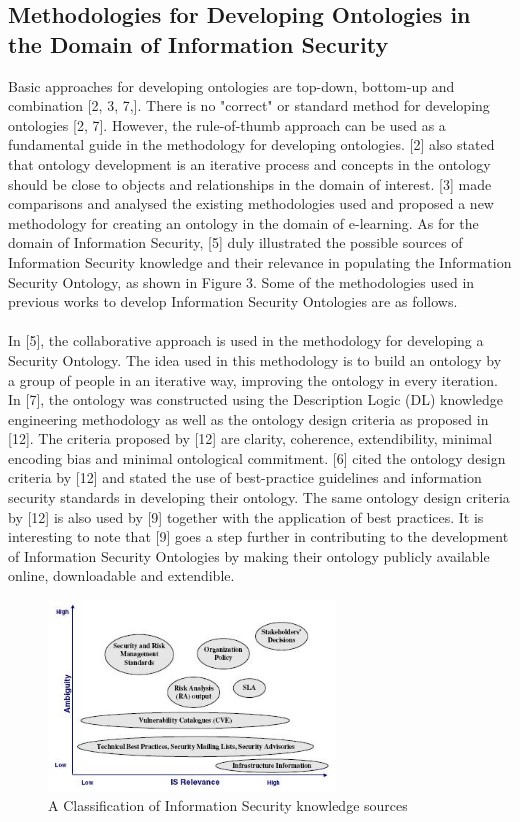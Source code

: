 \documentclass[conference, compsoc]{IEEEtran}
\begin{document}
\subsection{Methodologies for Developing Ontologies in the Domain of Information Security}
Basic approaches for developing ontologies are top-down, bottom-up and combination [2, 3, 7,]. There is no "correct" or standard method for developing ontologies [2, 7]. However, the rule-of-thumb approach can be used as a fundamental guide in the methodology for developing ontologies. [2] also stated that ontology development is an iterative process and concepts in the ontology should be close to objects and relationships in the domain of interest. [3] made comparisons and analysed the existing methodologies used and proposed a new methodology for creating an ontology in the domain of e-learning. As for the domain of Information Security, [5] duly illustrated the possible sources of Information Security knowledge and their relevance in  populating the Information Security Ontology, as shown in Figure 3. Some of the methodologies used in previous works to develop Information Security Ontologies are as follows.\\
\\
In [5], the collaborative approach is used in the methodology for developing a Security Ontology. The idea used in this methodology is to build an ontology by a group of people in an iterative way, improving the ontology in every iteration. In [7], the ontology was constructed using the Description Logic (DL) knowledge engineering methodology as well as the ontology design criteria as proposed in [12]. The criteria proposed by [12] are clarity, coherence, extendibility, minimal encoding bias and minimal ontological commitment. [6] cited the ontology design criteria by [12] and stated the use of best-practice guidelines and information security standards in developing their ontology. The same ontology design criteria by [12] is also used by [9] together with the application of best practices. It is interesting to note that [9] goes a step further in contributing to the development of Information Security Ontologies by making their ontology publicly available online, downloadable and  extendible.

\begin{figure}[!t]
\centering
\includegraphics[width=3.0in]{IS-sources}
\caption{A Classification of Information Security knowledge sources}
\label{IS-sources}
\end{figure}
\end{document}
